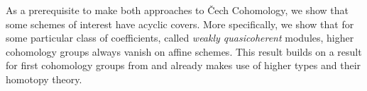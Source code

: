 \documentclass[letterpaper]{../util/easychair}
\begin{document}
As a prerequisite to make both approaches to \v{C}ech Cohomology,
we show that some schemes of interest have acyclic covers.
More specifically, we show that for some particular class of coefficients, called \emph{weakly quasicoherent} modules,
higher cohomology groups always vanish on affine schemes.
This result builds on a result for first cohomology groups from \cite{draft}
and already makes use of higher types and their homotopy theory.

\printbibliography
\end{document}
